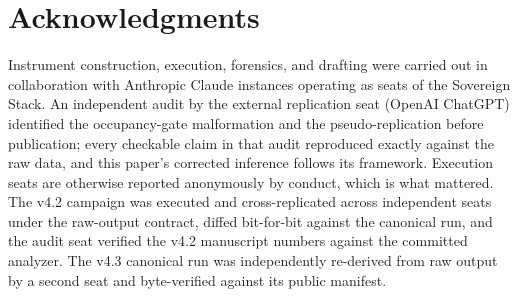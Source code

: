 \documentclass[11pt]{article}
\begin{document}
\section*{Acknowledgments}
Instrument construction, execution, forensics, and drafting were carried out in collaboration with Anthropic Claude instances operating as seats of the Sovereign Stack. An independent audit by the external replication seat (OpenAI ChatGPT) identified the occupancy-gate malformation and the pseudo-replication before publication; every checkable claim in that audit reproduced exactly against the raw data, and this paper's corrected inference follows its framework. Execution seats are otherwise reported anonymously by conduct, which is what mattered. The v4.2 campaign was executed and cross-replicated across independent seats under the raw-output contract, diffed bit-for-bit against the canonical run, and the audit seat verified the v4.2 manuscript numbers against the committed analyzer. The v4.3 canonical run was independently re-derived from raw output by a second seat and byte-verified against its public manifest.
\end{document}
